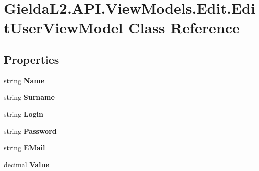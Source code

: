 \hypertarget{class_gielda_l2_1_1_a_p_i_1_1_view_models_1_1_edit_1_1_edit_user_view_model}{}\section{Gielda\+L2.\+A\+P\+I.\+View\+Models.\+Edit.\+Edit\+User\+View\+Model Class Reference}
\label{class_gielda_l2_1_1_a_p_i_1_1_view_models_1_1_edit_1_1_edit_user_view_model}
\subsection*{Properties}
\begin{DoxyCompactItemize}
\item 
\mbox{\label{class_gielda_l2_1_1_a_p_i_1_1_view_models_1_1_edit_1_1_edit_user_view_model_ae9109f069c9be093838d88fe9369033a}} 
string {\bfseries Name}
\item 
\mbox{\label{class_gielda_l2_1_1_a_p_i_1_1_view_models_1_1_edit_1_1_edit_user_view_model_adcce071d361066aff2b1d196ec6a28ff}} 
string {\bfseries Surname}
\item 
\mbox{\label{class_gielda_l2_1_1_a_p_i_1_1_view_models_1_1_edit_1_1_edit_user_view_model_a3d111ad59c972cc3bf50f579c7d6ed4b}} 
string {\bfseries Login}
\item 
\mbox{\label{class_gielda_l2_1_1_a_p_i_1_1_view_models_1_1_edit_1_1_edit_user_view_model_a259ece96f9fd350acf96b8eed6d0ae16}} 
string {\bfseries Password}
\item 
\mbox{\label{class_gielda_l2_1_1_a_p_i_1_1_view_models_1_1_edit_1_1_edit_user_view_model_a0abf50d8c74646aeaf635c8837d8e3f3}} 
string {\bfseries E\+Mail}
\item 
\mbox{\label{class_gielda_l2_1_1_a_p_i_1_1_view_models_1_1_edit_1_1_edit_user_view_model_a9a5d82ee4d094190f2a4bdcca7ccb0e6}} 
decimal {\bfseries Value}
\end{DoxyCompactItemize}


